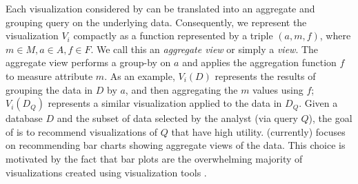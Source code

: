 Each visualization considered by \SeeDB can be translated into an aggregate
and grouping query on the underlying data.
Consequently, we represent the visualization $V_i$ 
compactly as a function represented by a triple $(a, m, f)$, 
where $m \in M, a \in A, f \in F$.   
We call this an {\em aggregate view} or simply a {\em view}.
The aggregate view performs a group-by on $a$ and applies the aggregation function $f$ 
to measure attribute $m$. 
As an example, $V_i(D)$ represents the results of grouping
the data in $D$ by $a$, and then aggregating the $m$ values using $f$;
$V_i(D_Q)$ represents a similar visualization applied to
the data in $D_Q$.
Given a database $D$ and the subset of data selected by the analyst (via query $Q$), 
the goal of \SeeDB is to recommend visualizations of $Q$ that have high utility. 
\SeeDB (currently) focuses on recommending bar charts showing aggregate views of the 
data.
This choice is motivated by the fact that bar plots are the overwhelming
majority of visualizations created using visualization tools 
\cite{DBLP:journals/sigmod_record/MortonBGKM14}.
\fi
